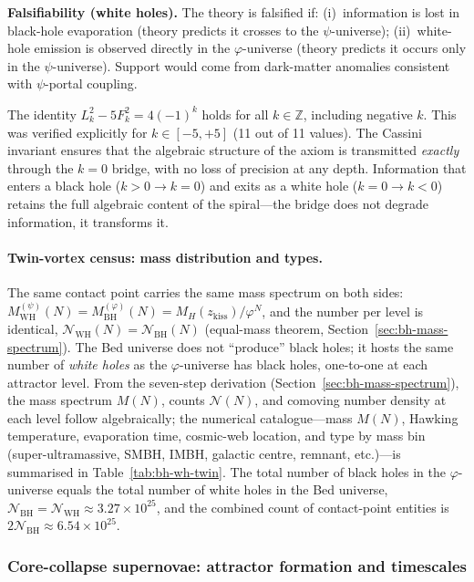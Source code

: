 \documentclass[12pt,a4paper]{article}
\newcommand{\bed}{Bed universe}
\begin{document}
\noindent\textbf{Falsifiability (white holes).} The theory is falsified if: (i)~information is lost in black-hole evaporation (theory predicts it crosses to the $\psi$-universe); (ii)~white-hole emission is observed directly in the $\varphi$-universe (theory predicts it occurs only in the $\psi$-universe). Support would come from dark-matter anomalies consistent with $\psi$-portal coupling.

The identity $L_k^2 - 5F_k^2 = 4(-1)^k$ holds for all $k \in \mathbb{Z}$, including negative $k$. This was verified explicitly for $k \in [-5, +5]$ (11 out of 11 values). The Cassini invariant ensures that the algebraic structure of the axiom is transmitted \emph{exactly} through the $k = 0$ bridge, with no loss of precision at any depth. Information that enters a black hole ($k > 0 \to k = 0$) and exits as a white hole ($k = 0 \to k < 0$) retains the full algebraic content of the spiral---the bridge does not degrade information, it transforms it.

\paragraph{Twin-vortex census: mass distribution and types.}
The same contact point carries the same mass spectrum on both sides: $M_{\mathrm{WH}}^{(\psi)}(N) = M_{\mathrm{BH}}^{(\varphi)}(N) = M_H(z_{\mathrm{kiss}})/\varphi^N$, and the number per level is identical, $\mathcal{N}_{\mathrm{WH}}(N) = \mathcal{N}_{\mathrm{BH}}(N)$ (equal-mass theorem, Section~\ref{sec:bh-mass-spectrum}). The \bed{} does not ``produce'' black holes; it hosts the same number of \emph{white holes} as the $\varphi$-universe has black holes, one-to-one at each attractor level. From the seven-step derivation (Section~\ref{sec:bh-mass-spectrum}), the mass spectrum $M(N)$, counts $\mathcal{N}(N)$, and comoving number density at each level follow algebraically; the numerical catalogue---mass $M(N)$, Hawking temperature, evaporation time, cosmic-web location, and type by mass bin (super-ultramassive, SMBH, IMBH, galactic centre, remnant, etc.)---is summarised in Table~\ref{tab:bh-wh-twin}. The total number of black holes in the $\varphi$-universe equals the total number of white holes in the \bed{}, $\mathcal{N}_{\mathrm{BH}} = \mathcal{N}_{\mathrm{WH}} \approx 3.27 \times 10^{25}$, and the combined count of contact-point entities is $2\mathcal{N}_{\mathrm{BH}} \approx 6.54 \times 10^{25}$.

\subsubsection{Core-collapse supernovae: attractor formation and timescales}
\label{sec:supernova}
\end{document}
